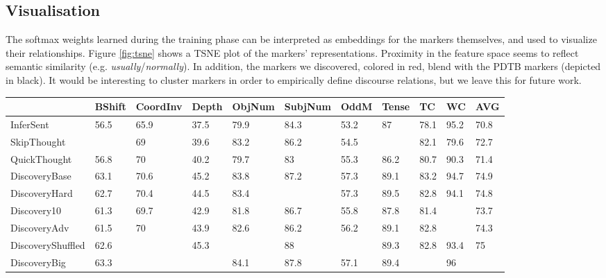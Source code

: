 \documentclass[11pt,a4paper]{article}
\begin{document}
\subsection{Visualisation}
The softmax weights learned during the training phase can be interpreted as embeddings for the markers themselves, and used to visualize their relationships.
Figure \ref{fig:tsne} shows a TSNE \citep{vanDerMaaten2008} plot of the markers' representations. Proximity in the feature space seems to reflect semantic similarity (e.g. \textit{usually}/\textit{normally}). In addition, the markers we discovered, colored in red, blend with the PDTB markers (depicted in black).
It would be interesting to cluster markers in order to empirically define discourse relations, but we leave this for future work. 
\begin{table*}[htb]
\centering
\small
\begin{tabular}{lllllllllll}
\toprule
{} &      BShift & CoordInv&            Depth &        ObjNum &       SubjNum &        OddM &            Tense &  TC&      WC&              AVG \\
\midrule
InferSent         &             56.5 &                  65.9 &             37.5 &             79.9 &             84.3 &             53.2 &               87 &             78.1 &             95.2 &             70.8 \\
SkipThought       &   &                    69 &             39.6 &             83.2 &             86.2 &             54.5 &   &             82.1 &             79.6 &             72.7 \\
QuickThought      &             56.8 &                    70 &             40.2 &             79.7 &               83 &             55.3 &             86.2 &             80.7 &             90.3 &             71.4 \\
DiscoveryBase         &             63.1 &                  70.6 &             45.2 &             83.8 &             87.2 &             57.3 &             89.1 &             83.2 &             94.7 &             74.9 \\
DiscoveryHard     &             62.7 &                  70.4 &             44.5 &             83.4 &   &             57.3 &             89.5 &             82.8 &             94.1 &             74.8 \\
Discovery10       &             61.3 &                  69.7 &             42.9 &             81.8 &             86.7 &             55.8 &             87.8 &             81.4 &   &             73.7 \\
DiscoveryAdv      &             61.5 &                    70 &             43.9 &             82.6 &             86.2 &             56.2 &             89.1 &             82.8 &   &             74.3 \\
DiscoveryShuffled &             62.6 &        &             45.3 &   &               88 &   &             89.3 &             82.8 &             93.4 &               75 \\
DiscoveryBig      &             63.3 &        &   &             84.1 &             87.8 &             57.1 &             89.4 &   &               96 &   \\
\bottomrule
\end{tabular}


\end{table*}
\end{document}
